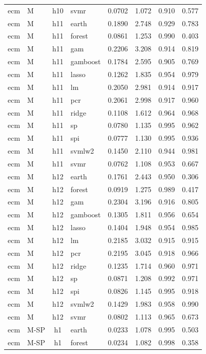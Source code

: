 \begin{ThreePartTable}
\begin{longtable}[t]{llclcccc}
ecm & M & h10 & svmr & 0.0702 & 1.072 & 0.910 & 0.577\\
\addlinespace
ecm & M & h11 & earth & 0.1890 & 2.748 & 0.929 & 0.783\\
ecm & M & h11 & forest & 0.0861 & 1.253 & 0.990 & 0.403\\
ecm & M & h11 & gam & 0.2206 & 3.208 & 0.914 & 0.819\\
ecm & M & h11 & gamboost & 0.1784 & 2.595 & 0.905 & 0.769\\
ecm & M & h11 & lasso & 0.1262 & 1.835 & 0.954 & 0.979\\
ecm & M & h11 & lm & 0.2050 & 2.981 & 0.914 & 0.917\\
ecm & M & h11 & pcr & 0.2061 & 2.998 & 0.917 & 0.960\\
ecm & M & h11 & ridge & 0.1108 & 1.612 & 0.964 & 0.968\\
ecm & M & h11 & sp & 0.0780 & 1.135 & 0.995 & 0.962\\
ecm & M & h11 & spi & 0.0777 & 1.130 & 0.995 & 0.936\\
ecm & M & h11 & svmlw2 & 0.1450 & 2.110 & 0.944 & 0.981\\
ecm & M & h11 & svmr & 0.0762 & 1.108 & 0.953 & 0.667\\
\addlinespace
ecm & M & h12 & earth & 0.1761 & 2.443 & 0.950 & 0.306\\
ecm & M & h12 & forest & 0.0919 & 1.275 & 0.989 & 0.417\\
ecm & M & h12 & gam & 0.2304 & 3.196 & 0.916 & 0.805\\
ecm & M & h12 & gamboost & 0.1305 & 1.811 & 0.956 & 0.654\\
ecm & M & h12 & lasso & 0.1404 & 1.948 & 0.954 & 0.985\\
ecm & M & h12 & lm & 0.2185 & 3.032 & 0.915 & 0.915\\
ecm & M & h12 & pcr & 0.2195 & 3.045 & 0.918 & 0.966\\
ecm & M & h12 & ridge & 0.1235 & 1.714 & 0.960 & 0.971\\
ecm & M & h12 & sp & 0.0871 & 1.208 & 0.992 & 0.971\\
ecm & M & h12 & spi & 0.0826 & 1.145 & 0.995 & 0.918\\
ecm & M & h12 & svmlw2 & 0.1429 & 1.983 & 0.958 & 0.990\\
ecm & M & h12 & svmr & 0.0802 & 1.113 & 0.965 & 0.673\\
\addlinespace
ecm & M-SP & h1 & earth & 0.0233 & 1.078 & 0.995 & 0.503\\
ecm & M-SP & h1 & forest & 0.0234 & 1.082 & 0.998 & 0.358\\

\end{longtable}
\end{ThreePartTable}
